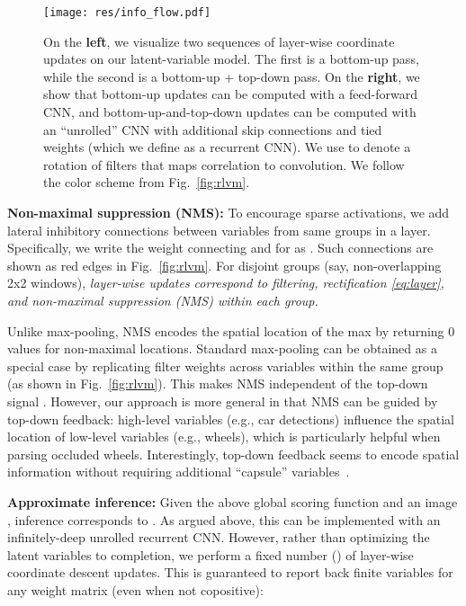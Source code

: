 \documentclass[10pt,twocolumn,letterpaper]{article}
\begin{document}
\begin{figure}[t!]
  \centering
  \texttt{[image: res/info\_flow.pdf]}
\caption{On the {\bf left}, we visualize two sequences of layer-wise
    coordinate updates on our latent-variable model. The first is a
    bottom-up pass, while the second is a bottom-up + top-down
    pass. On the {\bf right}, we show that bottom-up updates can be
    computed with a feed-forward CNN, and bottom-up-and-top-down
    updates can be computed with an ``unrolled'' CNN with additional
    skip connections and tied weights (which we define as a recurrent
    CNN). We use  to denote a  rotation of filters that
    maps correlation to convolution. We follow the color scheme from
    Fig.~\ref{fig:rlvm}.
  }\label{fig:info}
\end{figure}


{\bf Non-maximal suppression (NMS):} To encourage sparse activations,
we add lateral inhibitory connections between variables from same
groups in a layer. Specifically, we write the weight connecting
 and  for  as
. Such connections are shown as red edges in
Fig.~\ref{fig:rlvm}. For disjoint groups (say, non-overlapping 2x2
windows), {\em layer-wise updates correspond to filtering,
  rectification \eqref{eq:layer}, and non-maximal suppression (NMS)
  within each group.}

Unlike max-pooling, NMS encodes the spatial location of the max by
returning 0 values for non-maximal locations. Standard max-pooling can
be obtained as a special case by replicating filter weights 
across variables  within the same group (as shown in
Fig.~\ref{fig:rlvm}). This makes NMS independent of the top-down
signal . However, our approach is more general in that NMS can
be guided by top-down feedback: high-level variables (e.g., car detections)
influence the spatial location of low-level
variables (e.g., wheels), which is particularly helpful when parsing occluded wheels. Interestingly, top-down feedback seems to encode
spatial information without requiring additional ``capsule''
variables~\cite{hinton2011transforming}.

{\bf Approximate inference:} Given the above global scoring function
and an image , inference corresponds to . As
argued above, this can be implemented with an infinitely-deep unrolled
recurrent CNN. However, rather than optimizing the latent variables to
completion, we perform a fixed number () of layer-wise coordinate
descent updates. This is guaranteed to report back finite variables
 for any weight matrix  (even when not copositive):
\end{document}
